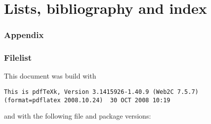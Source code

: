 \begin{table}[htb]
\part{Lists, bibliography and index}
\bgroup
\lhead{}\rhead{}
\clearpage{}
\listoffigures
\clearpage{}
\listoftables
\clearpage{}

{\nocite{*}
\raggedright


}
\clearpage{}
{\let\BSL\textbackslash
\renewcommand\textbackslash{{\ttfamily\BSL}}
\printindex{}
}
\egroup


\appendix
\section*{Appendix}
\section{Filelist}
This document was build with

\begin{lstlisting}[breaklines,xrightmargin=-\marginparwidth]
This is pdfTeXk, Version 3.1415926-1.40.9 (Web2C 7.5.7) (format=pdflatex 2008.10.24)  30 OCT 2008 10:19
\end{lstlisting}

and with the following file and package versions:



\end{table}
